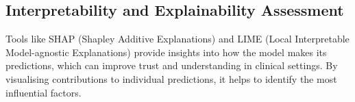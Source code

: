 \subsection{Interpretability and Explainability Assessment}\leavevmode
Tools like SHAP (Shapley Additive Explanations) and LIME (Local Interpretable Model-agnostic Explanations) provide insights into how the model makes its predictions, which can improve trust and understanding in clinical settings. By visualising contributions to individual predictions, it helps to identify the most influential factors.